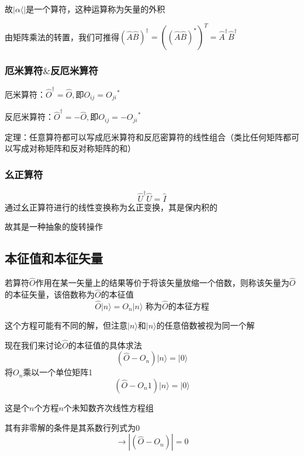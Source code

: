 \documentclass[lang=cn,15pt]{elegantbook}
\begin{document}
故$|\alpha  \langle  |$是一个算符，这种运算称为矢量的外积

由矩阵乘法的转置，我们可推得$\left( \hat{A}\hat{B} \right) ^{\dagger}=\left( \left( \hat{A}\hat{B} \right) ^* \right) ^T=\hat{A}^{\dagger}\hat{B}^{\dagger}
$
\subsubsection{厄米算符$\&$反厄米算符}

厄米算符：$\hat{O}^{\dagger}=\hat{O},\text{即}O_{ij}={O_{ji}}^*
$

反厄米算符：$\hat{O}^{\dagger}=-\hat{O},\text{即}O_{ij}=-{O_{ji}}^*$

定理：任意算符都可以写成厄米算符和反厄密算符的线性组合（类比任何矩阵都可以写成对称矩阵和反对称矩阵的和）
\subsubsection{幺正算符}

\begin{equation*}
	\hat{U}^{\dagger}\hat{U}=\hat{I}
\end{equation*}
通过幺正算符进行的线性变换称为幺正变换，其是保内积的

故其是一种抽象的旋转操作
\subsection{本征值和本征矢量}

若算符$\hat{O}$作用在某一矢量上的结果等价于将该矢量放缩一个倍数，则称该矢量为$\hat{O}$的本征矢量，该倍数称为$\hat{O}$的本征值
\begin{equation*}
	\hat{O}|n\rangle =O_n|n\rangle \,\,\text{称为}\hat{O}\text{的本征方程}
\end{equation*}

这个方程可能有不同的解，但注意$|n\rangle $和$|n\rangle $的任意倍数被视为同一个解

现在我们来讨论$\hat{O}$的本征值的具体求法
\begin{equation*}
	(\hat{O}-O_n)|n\rangle=|0\rangle
\end{equation*}
将$O_n$乘以一个单位矩阵1
\begin{equation*}
	(\hat{O}-O_n1)|n\rangle=|0\rangle
\end{equation*}

这是个$n$个方程$n$个未知数齐次线性方程组

其有非零解的条件是其系数行列式为0
\begin{equation*}
	\rightarrow|	(\hat{O}-O_n)|=0
\end{equation*}
\end{document}
